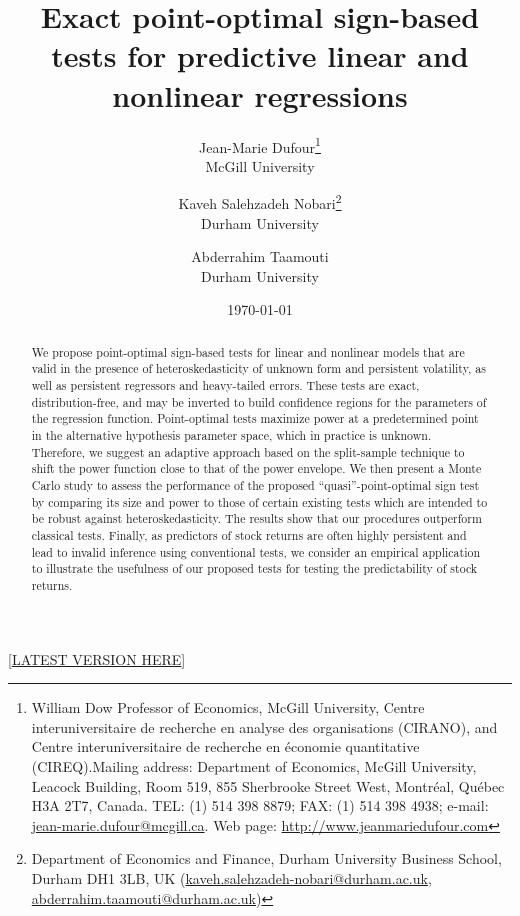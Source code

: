 \documentclass[harvard,11pt]{article}
\newcommand*\samethanks[1][\value{footnote}]{\footnotemark[#1]}
\begin{document}
\title{{Exact point-optimal sign-based tests for predictive linear and nonlinear regressions}}
\author{Jean-Marie Dufour\thanks{%
William Dow Professor of Economics, McGill University, Centre interuniversitaire de recherche en analyse des
organisations (CIRANO), and Centre interuniversitaire de recherche en économie quantitative (CIREQ).Mailing address:
Department of Economics, McGill University, Leacock Building, Room 519, 855 Sherbrooke Street West, Montréal,
Québec H3A 2T7, Canada. TEL: (1) 514 398 8879; FAX: (1) 514 398 4938; e-mail: \href{emailto:jean-marie.dufour@mcgill.ca}{jean-marie.dufour@mcgill.ca}. Web
page: \href{http://www.jeanmariedufour.com}{http://www.jeanmariedufour.com}}\\
McGill University\and Kaveh Salehzadeh Nobari\thanks{%
Department of Economics and Finance, Durham University Business School, Durham DH1 3LB, UK
(\href{emailto: kaveh.salehzadeh-nobari@durham.ac.uk)}{kaveh.salehzadeh-nobari@durham.ac.uk}, \href{emailto: abderrahim.taamouti@durham.ac.uk)}{abderrahim.taamouti@durham.ac.uk})}\\
Durham University \and Abderrahim Taamouti\samethanks[2]\\
Durham University}
\date{\today}
\maketitle
\begin{center}
[\href{https://kavehsn.github.io/Job-Market-Paper/Point_Optimal_Sign_Tests_Dependent_Data_2020.pdf}{\underline{LATEST VERSION HERE}}]
\end{center}


\begin{abstract}
We propose point-optimal sign-based tests for linear and nonlinear models that are valid
 in the presence of heteroskedasticity of unknown form and persistent volatility, as well as persistent regressors and heavy-tailed errors. These tests are exact, distribution-free, and may be inverted to build confidence regions for the parameters of the
regression function. Point-optimal tests maximize power at a predetermined point in the alternative hypothesis parameter space, which in practice is unknown. Therefore, we suggest an adaptive approach based on the split-sample technique to shift the power function close to that of the power envelope. We then present a Monte Carlo study to assess the performance of the proposed \textquotedblleft quasi\textquotedblright -point-optimal sign test by comparing its size and
power to those of certain existing tests which are intended to be robust
against heteroskedasticity. The results show that our procedures outperform classical tests. Finally, as predictors of stock returns are often highly persistent and lead to invalid inference using conventional tests, we consider an empirical application to
illustrate the usefulness of our proposed tests for testing the
predictability of stock returns.
\end{abstract}
\end{document}
